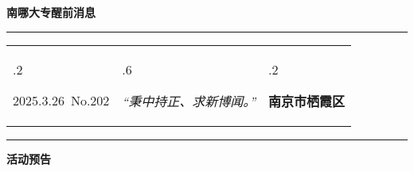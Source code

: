 \documentclass[letterpaper, 12pt]{article}
\begin{document}
\begin{center}
    \Huge\textbf{南哪大专醒前消息}
\end{center}
\vspace{4mm}
\hrule
\renewcommand\tabularxcolumn[1]{m{#1}}
\begin{tabularx}{\textwidth}{>{\hsize.2\hsize}X>{\hsize.6\hsize}X>{\hsize.2\hsize}X}
    \begin{flushleft}
        2025.3.26\, No.202
    \end{flushleft}
    &
    \begin{center}
        \textit{“秉中持正、求新博闻。”}
    \end{center}
    &
    \begin{flushright}
        \textbf{南京市栖霞区}
    \end{flushright}
\end{tabularx}
\vspace{-3.5mm}
\hrule
\vspace{4mm}
\centerline{\huge\textbf{活动预告}}
\end{document}
